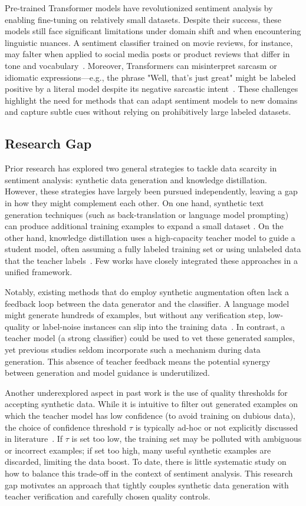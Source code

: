 \documentclass[11pt]{article}
\begin{document}
Pre-trained Transformer models have revolutionized sentiment analysis
by enabling fine-tuning on relatively small datasets. Despite their
success, these models still face significant limitations under domain
shift and when encountering linguistic nuances. A sentiment
classifier trained on movie reviews, for instance, may falter when
applied to social media posts or product reviews that differ in tone
and vocabulary~\cite{CITATION_NEEDED}. Moreover, Transformers can
misinterpret sarcasm or idiomatic expressions---e.g., the phrase "Well,
that's just great" might be labeled positive by a literal model
despite its negative sarcastic intent~\cite{CITATION_NEEDED}. These
challenges highlight the need for methods that can adapt sentiment
models to new domains and capture subtle cues without relying on
prohibitively large labeled datasets.

\subsection{Research Gap}
Prior research has explored two general strategies to tackle data
scarcity in sentiment analysis: synthetic data generation and
knowledge distillation. However, these strategies have largely been
pursued independently, leaving a gap in how they might complement
each other. On one hand, synthetic text generation techniques (such
as back-translation or language model prompting) can produce
additional training examples to expand a small dataset
\cite{CITATION_NEEDED}. On the other hand, knowledge distillation uses a
high-capacity teacher model to guide a student model, often assuming
a fully labeled training set or using unlabeled data that the teacher
labels~\cite{CITATION_NEEDED}. Few works have closely integrated these
approaches in a unified framework.

Notably, existing methods that do employ synthetic augmentation often
lack a feedback loop between the data generator and the classifier. A
language model might generate hundreds of examples, but without any
verification step, low-quality or label-noise instances can slip into
the training data~\cite{CITATION_NEEDED}. In contrast, a teacher model (a
strong classifier) could be used to vet these generated samples, yet
previous studies seldom incorporate such a mechanism during data
generation. This absence of teacher feedback means the potential
synergy between generation and model guidance is underutilized.

Another underexplored aspect in past work is the use of quality
thresholds for accepting synthetic data. While it is intuitive to
filter out generated examples on which the teacher model has low
confidence (to avoid training on dubious data), the choice of
confidence threshold $\tau$ is typically ad-hoc or not explicitly
discussed in literature~\cite{CITATION_NEEDED}. If $\tau$ is set too low,
the training set may be polluted with ambiguous or incorrect
examples; if set too high, many useful synthetic examples are
discarded, limiting the data boost. To date, there is little
systematic study on how to balance this trade-off in the context of
sentiment analysis. This research gap motivates an approach that
tightly couples synthetic data generation with teacher verification
and carefully chosen quality controls.
\end{document}
